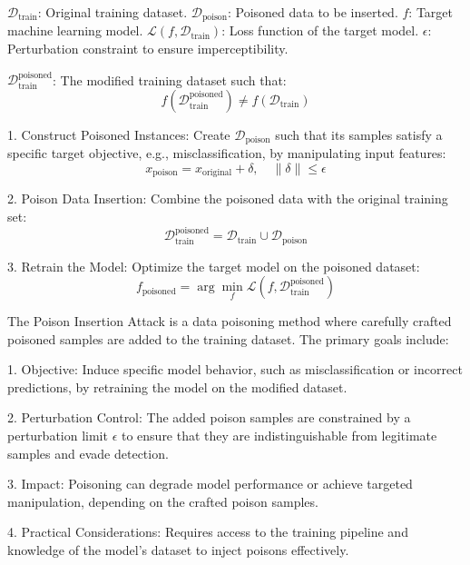 
$\mathcal{D}_{\text{train}}$: Original training dataset.  
$\mathcal{D}_{\text{poison}}$: Poisoned data to be inserted.  
$f$: Target machine learning model.  
$\mathcal{L}(f, \mathcal{D}_{\text{train}})$: Loss function of the target model.  
$\epsilon$: Perturbation constraint to ensure imperceptibility.

$\mathcal{D}_{\text{train}}^{\text{poisoned}}$: The modified training dataset such that:  
\[
f(\mathcal{D}_{\text{train}}^{\text{poisoned}}) \neq f(\mathcal{D}_{\text{train}})
\]

1. Construct Poisoned Instances:  
   Create $\mathcal{D}_{\text{poison}}$ such that its samples satisfy a specific target objective, e.g., misclassification, by manipulating input features:  
   \[
   x_{\text{poison}} = x_{\text{original}} + \delta, \quad \|\delta\| \leq \epsilon
   \]  

2. Poison Data Insertion:  
   Combine the poisoned data with the original training set:  
   \[
   \mathcal{D}_{\text{train}}^{\text{poisoned}} = \mathcal{D}_{\text{train}} \cup \mathcal{D}_{\text{poison}}
   \]

3. Retrain the Model:  
   Optimize the target model on the poisoned dataset:  
   \[
   f_{\text{poisoned}} = \arg \min_f \mathcal{L}(f, \mathcal{D}_{\text{train}}^{\text{poisoned}})
   \]

The Poison Insertion Attack is a data poisoning method where carefully crafted poisoned samples are added to the training dataset. The primary goals include:  

1. Objective: Induce specific model behavior, such as misclassification or incorrect predictions, by retraining the model on the modified dataset.  

2. Perturbation Control: The added poison samples are constrained by a perturbation limit $\epsilon$ to ensure that they are indistinguishable from legitimate samples and evade detection.  

3. Impact: Poisoning can degrade model performance or achieve targeted manipulation, depending on the crafted poison samples.  

4. Practical Considerations: Requires access to the training pipeline and knowledge of the model’s dataset to inject poisons effectively.